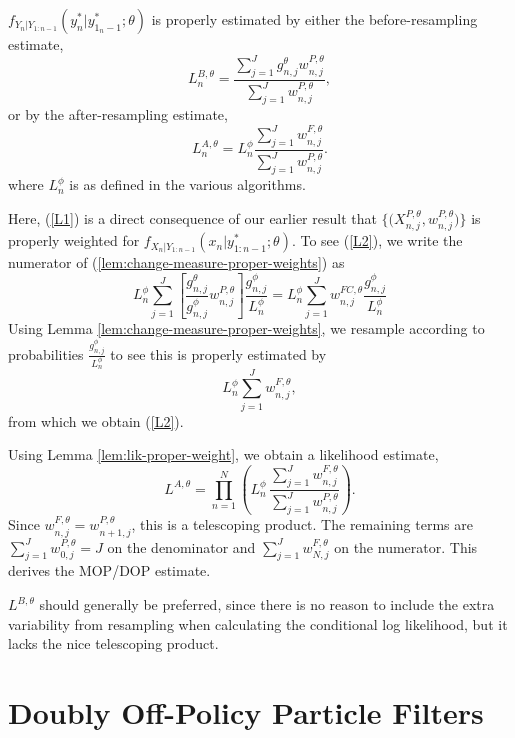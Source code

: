 \documentclass{article}
\begin{document}
\begin{lem}
    \label{lem:lik-proper-weight}
  $f_{Y_n|Y_{1:n-1}}(y_n^*|y_{1_n-1}^*;\theta)$ is properly estimated by either the before-resampling estimate,
\begin{equation}\label{L1}
L_n^{B,\theta} =  \frac{\sum_{j=1}^Jg^\theta_{n,j} w^{P,\theta}_{n,j}}{\sum_{j=1}^J  w^{P,\theta}_{n,j}},
\end{equation}
or by the after-resampling estimate,
\begin{equation}\label{L2}
L_n^{A,\theta} = L^\phi_n \frac{\sum_{j=1}^Jw^{F,\theta}_{n,j}}{\sum_{j=1}^J  w^{P,\theta}_{n,j}}.
\end{equation}
where $L^\phi_n$ is as defined in the various algorithms.
\end{lem}

Here, (\ref{L1}) is a direct consequence of our earlier result that $\{ \big(X^{P,\theta}_{n,j},w^{P,\theta}_{n,j}\big) \}$ is properly weighted for $f_{X_{n}|Y_{1:n-1}}(x_{n}|y^*_{1:n-1};\theta)$.
To see  (\ref{L2}),
we write the numerator of (\ref{lem:change-measure-proper-weights}) as
\[
L^\phi_n \sum_{j=1}^J \left[ \frac{g^\theta_{n,j}}{g^\phi_{n,j}} w^{P,\theta}_{n,j}\right] \frac{g^\phi_{n,j}}{L_n^\phi}
= L^\phi_n \sum_{j=1}^J w_{n,j}^{FC,\theta} \frac{g^\phi_{n,j}}{L_n^\phi}
\]
Using Lemma \ref{lem:change-measure-proper-weights}, we resample according to probabilities $\frac{g^\phi_{n,j}}{L_n^\phi}$ to see this is properly estimated by
\[
L^\phi_n \sum_{j=1}^J w^{F,\theta}_{n,j},
\]
from which we obtain (\ref{L2}).

Using Lemma \ref{lem:lik-proper-weight}, we obtain a likelihood estimate,
\[
L^{A,\theta} = \prod_{n=1}^N \left( L^\phi_n \, \frac{\sum_{j=1}^J w^{F,\theta}_{n,j}}{\sum_{j=1}^J w^{P,\theta}_{n,j}}\right).
\]
Since $w^{F,\theta}_{n,j}=w^{P,\theta}_{n+1,j}$, this is a telescoping product. The remaining terms are
$\sum_{j=1}^J w^{P,\theta}_{0,j} = J$ on the denominator and $\sum_{j=1}^J w^{F,\theta}_{N,j}$ on the numerator.
This derives the MOP/DOP estimate.

$L^{B,\theta}$ should generally be preferred, since there is no reason to include the extra variability from resampling when calculating the conditional log likelihood, but it lacks the nice telescoping product.



\section{Doubly Off-Policy Particle Filters}
\label{app:dop}
\end{document}

